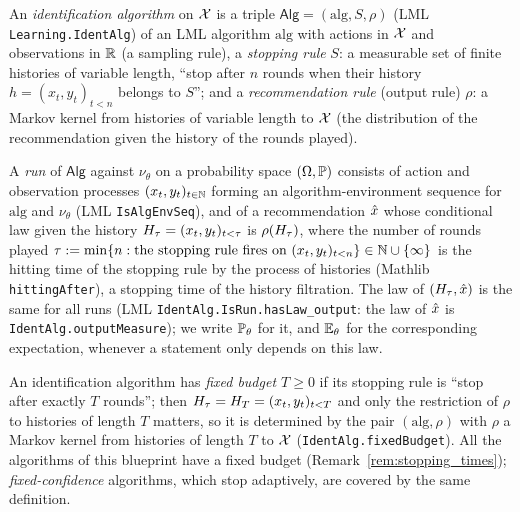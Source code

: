 \begin{definition}\label{def:bai_alg}
\leanok
{}
An \emph{identification algorithm} on $\mathcal{X}$ is a triple $\mathsf{Alg} = (\mathrm{alg}, S, \rho)$
(LML \texttt{Learning.IdentAlg}) of an LML algorithm $\mathrm{alg}$ with actions in $\mathcal{X}$ and
observations in $\mathbb{R}$ (a sampling rule), a \emph{stopping rule} $S$: a measurable set of finite
histories of variable length, ``stop after $n$ rounds when their history
$h = (x_t,y_t)_{t<n}$ belongs to $S$''; and a \emph{recommendation rule} (output rule) $\rho$: a
Markov kernel from histories of variable length to $\mathcal{X}$ (the distribution of the
recommendation given the history of the rounds played).

A \emph{run} of $\mathsf{Alg}$ against $\nu_\theta$ on a probability space $(\Omega, \mathbb{P})$
consists of action and observation processes $(x_t, y_t)_{t\in\mathbb{N}}$ forming an
algorithm-environment sequence for $\mathrm{alg}$ and $\nu_\theta$ (LML
\texttt{IsAlgEnvSeq}), and of a recommendation $\hat{x}$ whose conditional law given the history
$H_\tau = (x_t,y_t)_{t<\tau}$ is $\rho(H_\tau)$, where the number of rounds played
$\tau := \min\{n : \text{the stopping rule fires on } (x_t,y_t)_{t<n}\} \in \mathbb{N} \cup \{\infty\}$
is the hitting time of the stopping rule by the process of histories (Mathlib
\texttt{hittingAfter}), a stopping time of the history filtration. The law of
$(H_\tau, \hat{x})$ is the same for all runs (LML \texttt{IdentAlg.IsRun.hasLaw\_output}: the
law of $\hat{x}$ is \texttt{IdentAlg.outputMeasure}); we write $\mathbb{P}_\theta$ for it, and
$\mathbb{E}_\theta$ for the corresponding expectation, whenever a statement only depends on this law.

An identification algorithm has \emph{fixed budget $T \ge 0$} if its stopping rule is ``stop
after exactly $T$ rounds''; then $H_\tau = H_T = (x_t,y_t)_{t<T}$ and only the
restriction of $\rho$ to histories of length $T$ matters, so it is determined by the pair
$(\mathrm{alg},\rho)$ with $\rho$ a Markov kernel from histories of length $T$ to $\mathcal{X}$
(\texttt{IdentAlg.fixedBudget}). All the algorithms of this
blueprint have a fixed budget (Remark~\ref{rem:stopping_times}); \emph{fixed-confidence}
algorithms, which stop adaptively, are covered by the same definition.
\end{definition}

